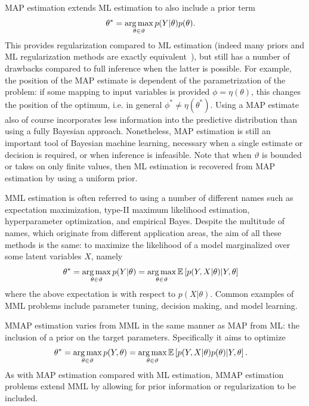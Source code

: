 MAP estimation extends ML estimation to also include a prior term
\begin{align}
\label{eq:opt:map}
\theta^* &= \operatorname*{arg\,max}_{\theta \in \vartheta} p(Y|\theta) p(\theta).	
\end{align}
This provides regularization compared to ML estimation (indeed many priors and
ML regularization methods are exactly equivalent~\citep{bishop2006pattern}),
but still has a number of drawbacks compared to full inference when the latter is
possible.  For example, the position of the MAP estimate is dependent of the
parametrization of the problem: if some mapping to input variables is
provided $\phi = \eta (\theta)$, this changes the position of the optimum, i.e.
in general $\phi^* \neq \eta (\theta^*)$.  Using a MAP estimate also of course
incorporates less information into the predictive distribution than using a
fully Bayesian approach.  Nonetheless, MAP estimation is still an important
tool of Bayesian machine learning, necessary when a single estimate or decision is required,
or when inference is infeasible.  Note that when $\vartheta$ is bounded or takes
on only finite values, then ML estimation is recovered from MAP estimation by using
a uniform prior.

MML estimation is often referred to using a number of different names such as expectation
maximization, type-II maximum likelihood estimation, hyperparameter optimization, and
empirical Bayes.  Despite the multitude of names, which originate from different application
areas, the aim of all these methods is the same: to maximize the likelihood of a model
marginalized over some latent variables $X$, namely
\begin{align}
	\label{eq:opt:MML}
	\theta^* &= \operatorname*{arg\,max}_{\theta \in \vartheta} p(Y|\theta) 
	= \operatorname*{arg\,max}_{\theta \in \vartheta} \mathbb{E} \left[p(Y,X|\theta) | Y, \theta\right]
\end{align}
where the above expectation is with respect to $p(X | \theta)$.  Common examples of MML
problems include parameter tuning, decision making, and model learning.

MMAP estimation varies from MML in the same manner as MAP from ML: the inclusion
of a prior on the target parameters.  Specifically it aims to optimize
\begin{align}
\label{eq:opt:MMAP}
\theta^* &= \operatorname*{arg\,max}_{\theta \in \vartheta} p(Y,\theta) 
= \operatorname*{arg\,max}_{\theta \in \vartheta} \mathbb{E} \left[p(Y,X|\theta) p(\theta) | Y, \theta\right].
\end{align}
As with MAP estimation compared with ML estimation, 
MMAP estimation problems extend MML by allowing for prior information or regularization to be
included.

